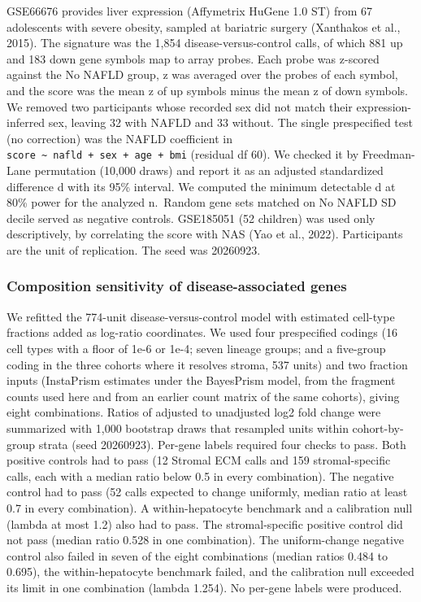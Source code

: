 GSE66676 provides liver expression (Affymetrix HuGene 1.0 ST) from 67 adolescents with severe obesity, sampled at bariatric surgery (Xanthakos et al., 2015). The signature was the 1,854 disease-versus-control calls, of which 881 up and 183 down gene symbols map to array probes. Each probe was z-scored against the No NAFLD group, z was averaged over the probes of each symbol, and the score was the mean z of up symbols minus the mean z of down symbols. We removed two participants whose recorded sex did not match their expression-inferred sex, leaving 32 with NAFLD and 33 without. The single prespecified test (no correction) was the NAFLD coefficient in \texttt{score\ \textasciitilde{}\ nafld\ +\ sex\ +\ age\ +\ bmi} (residual df 60). We checked it by Freedman-Lane permutation (10,000 draws) and report it as an adjusted standardized difference d with its 95\% interval. We computed the minimum detectable d at 80\% power for the analyzed n.~Random gene sets matched on No NAFLD SD decile served as negative controls. GSE185051 (52 children) was used only descriptively, by correlating the score with NAS (Yao et al., 2022). Participants are the unit of replication. The seed was 20260923.

\subsubsection{Composition sensitivity of disease-associated genes}\label{composition-sensitivity-of-disease-associated-genes}

We refitted the 774-unit disease-versus-control model with estimated cell-type fractions added as log-ratio coordinates. We used four prespecified codings (16 cell types with a floor of 1e-6 or 1e-4; seven lineage groups; and a five-group coding in the three cohorts where it resolves stroma, 537 units) and two fraction inputs (InstaPrism estimates under the BayesPrism model, from the fragment counts used here and from an earlier count matrix of the same cohorts), giving eight combinations. Ratios of adjusted to unadjusted log2 fold change were summarized with 1,000 bootstrap draws that resampled units within cohort-by-group strata (seed 20260923). Per-gene labels required four checks to pass. Both positive controls had to pass (12 Stromal ECM calls and 159 stromal-specific calls, each with a median ratio below 0.5 in every combination). The negative control had to pass (52 calls expected to change uniformly, median ratio at least 0.7 in every combination). A within-hepatocyte benchmark and a calibration null (lambda at most 1.2) also had to pass. The stromal-specific positive control did not pass (median ratio 0.528 in one combination). The uniform-change negative control also failed in seven of the eight combinations (median ratios 0.484 to 0.695), the within-hepatocyte benchmark failed, and the calibration null exceeded its limit in one combination (lambda 1.254). No per-gene labels were produced.

